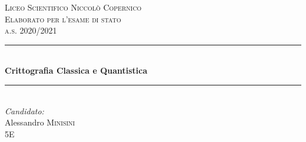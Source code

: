 \documentclass[italian,A4,12pt]{article}
\begin{document}
\begin{titlepage}

\newcommand{\HRule}{\rule{\linewidth}{0.5mm}} %

\center %


\textsc{\LARGE Liceo Scientifico Niccolò Copernico}\\[1.5cm] %
\textsc{\Large Elaborato per l'esame di stato}\\[0.5cm] %
\textsc{\large a.s. 2020/2021}\\[0.5cm] %


\HRule \\[0.4cm]
{ \huge \bfseries Crittografia Classica e Quantistica}\\[0.4cm] %
\HRule \\[1.5cm]




\Large \emph{Candidato:}\\
Alessandro \textsc{Minisini}\\[1cm] %
{\large 5E}\\[2cm]




\end{titlepage}
\end{document}
